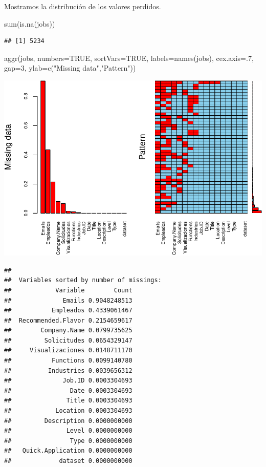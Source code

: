 \documentclass[
]{article}
\newenvironment{Shaded}{\begin{snugshade}}{\end{snugshade}}
\newcommand{\DataTypeTok}[1]{\textcolor[rgb]{0.87,0.87,0.75}{#1}}
\newcommand{\DecValTok}[1]{\textcolor[rgb]{0.86,0.86,0.80}{#1}}
\newcommand{\KeywordTok}[1]{\textcolor[rgb]{0.94,0.87,0.69}{#1}}
\newcommand{\NormalTok}[1]{\textcolor[rgb]{0.80,0.80,0.80}{#1}}
\newcommand{\OtherTok}[1]{\textcolor[rgb]{0.94,0.94,0.56}{#1}}
\newcommand{\StringTok}[1]{\textcolor[rgb]{0.80,0.58,0.58}{#1}}
\begin{document}
Mostramos la distribución de los valores perdidos.

\begin{Shaded}
\begin{Highlighting}[]
\KeywordTok{sum}\NormalTok{(}\KeywordTok{is.na}\NormalTok{(jobs))}
\end{Highlighting}
\end{Shaded}

\begin{verbatim}
## [1] 5234
\end{verbatim}

\begin{Shaded}
\begin{Highlighting}[]
\KeywordTok{aggr}\NormalTok{(jobs, }\DataTypeTok{numbers=}\OtherTok{TRUE}\NormalTok{, }\DataTypeTok{sortVars=}\OtherTok{TRUE}\NormalTok{, }\DataTypeTok{labels=}\KeywordTok{names}\NormalTok{(jobs),}
\DataTypeTok{cex.axis=}\NormalTok{.}\DecValTok{7}\NormalTok{, }\DataTypeTok{gap=}\DecValTok{3}\NormalTok{, }\DataTypeTok{ylab=}\KeywordTok{c}\NormalTok{(}\StringTok{"Missing data"}\NormalTok{,}\StringTok{"Pattern"}\NormalTok{))}
\end{Highlighting}
\end{Shaded}

\includegraphics{data_cleaning_files/figure-latex/unnamed-chunk-14-1.pdf}

\begin{verbatim}
## 
##  Variables sorted by number of missings: 
##            Variable        Count
##              Emails 0.9048248513
##           Empleados 0.4339061467
##  Recommended.Flavor 0.2154659617
##        Company.Name 0.0799735625
##         Solicitudes 0.0654329147
##     Visualizaciones 0.0148711170
##           Functions 0.0099140780
##          Industries 0.0039656312
##              Job.ID 0.0003304693
##                Date 0.0003304693
##               Title 0.0003304693
##            Location 0.0003304693
##         Description 0.0000000000
##               Level 0.0000000000
##                Type 0.0000000000
##   Quick.Application 0.0000000000
##             dataset 0.0000000000
\end{verbatim}
\end{document}
